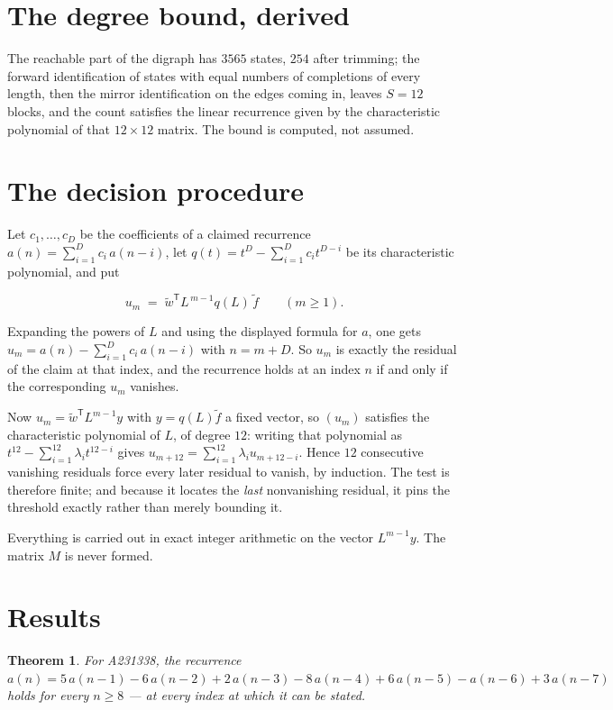 \documentclass[11pt]{article}
\newtheorem{theorem}{Theorem}
\theoremstyle{definition}
\begin{document}
\section{The degree bound, derived}

The reachable part of the digraph has $3565$ states, $254$ after trimming; the forward identification of states with equal numbers of completions of every length, then the mirror identification on the edges coming in, leaves $S = 12$ blocks, and the count satisfies the linear recurrence given by the characteristic polynomial of that $12\times12$ matrix. The bound is computed, not assumed.

\section{The decision procedure}

Let $c_1,\dots,c_D$ be the coefficients of a claimed recurrence $a(n) = \sum_{i=1}^{D} c_i\,a(n-i)$, let $q(t) = t^{D} - \sum_{i=1}^{D} c_i t^{D-i}$ be its characteristic polynomial, and put

\[u_m \;=\; \tilde w^{\mathsf T} L^{\,m-1} q(L)\,\tilde f \qquad (m \ge 1).\]

Expanding the powers of $L$ and using the displayed formula for $a$, one gets $u_m = a(n) - \sum_{i=1}^{D} c_i\,a(n-i)$ with $n = m + D$. So $u_m$ is exactly the residual of the claim at that index, and the recurrence holds at an index $n$ if and only if the corresponding $u_m$ vanishes.

Now $u_m = \tilde w^{\mathsf T} L^{m-1} y$ with $y = q(L)\tilde f$ a fixed vector, so $(u_m)$ satisfies the characteristic polynomial of $L$, of degree $12$: writing that polynomial as $t^{12} - \sum_{i=1}^{12} \lambda_i t^{12-i}$ gives $u_{m+12} = \sum_{i=1}^{12} \lambda_i u_{m+12-i}$. Hence $12$ consecutive vanishing residuals force every later residual to vanish, by induction. The test is therefore finite; and because it locates the {\itshape last} nonvanishing residual, it pins the threshold exactly rather than merely bounding it.

Everything is carried out in exact integer arithmetic on the vector $L^{m-1}y$. The matrix $M$ is never formed.

\section{Results}

\begin{theorem} For A231338, the recurrence $a(n) = 5\,a(n-1) - 6\,a(n-2) + 2\,a(n-3) - 8\,a(n-4) + 6\,a(n-5) - a(n-6) + 3\,a(n-7)$ holds for every $n \ge 8$ --- at every index at which it can be stated.\end{theorem}
\end{document}
